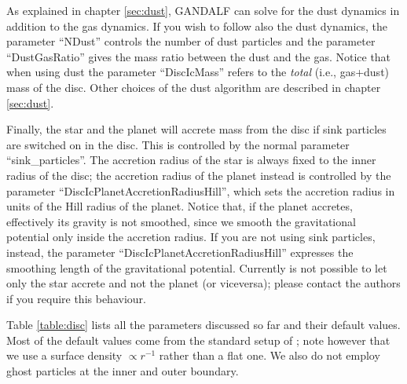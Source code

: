 \documentclass[a4paper]{article}
\begin{document}
As explained in chapter \ref{sec:dust}, GANDALF can solve for the dust dynamics in addition to the gas dynamics. If you wish to follow also the dust dynamics, the parameter ``NDust'' controls the number of dust particles and the parameter ``DustGasRatio'' gives the mass ratio between the dust and the gas. Notice that when using dust the parameter ``DiscIcMass'' refers to the \textit{total} (i.e., gas+dust) mass of the disc. Other choices of the dust algorithm are described in chapter \ref{sec:dust}.

Finally, the star and the planet will accrete mass from the disc if sink particles are switched on in the disc. This is controlled by the normal parameter ``sink\_particles''. The accretion radius of the star is always fixed to the inner radius of the disc; the accretion radius of the planet instead is controlled by the parameter ``DiscIcPlanetAccretionRadiusHill'', which sets the accretion radius in units of the Hill radius of the planet. Notice that, if the planet accretes, effectively its gravity is not smoothed, since we smooth the gravitational potential only inside the accretion radius. If you are not using sink particles, instead, the parameter ``DiscIcPlanetAccretionRadiusHill'' expresses the smoothing length of the gravitational potential. Currently is not possible to let only the star accrete and not the planet (or viceversa); please contact the authors if you require this behaviour.

Table \ref{table:disc} lists all the parameters discussed so far and their default values. Most of the default values come from the standard setup of \citet{deValBorro2006}; note however that we use a surface density $\propto r^{-1}$ rather than a flat one. We also do not employ ghost particles at the inner and outer boundary.
\end{document}
